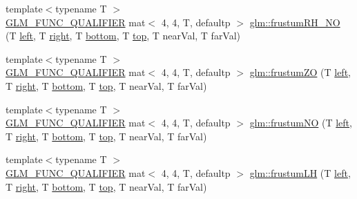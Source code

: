 \begin{DoxyCompactItemize}
\item 
{\footnotesize template$<$typename T $>$ }\\\hyperlink{setup_8hpp_a33fdea6f91c5f834105f7415e2a64407}{G\+L\+M\+\_\+\+F\+U\+N\+C\+\_\+\+Q\+U\+A\+L\+I\+F\+I\+ER} mat$<$ 4, 4, T, defaultp $>$ \hyperlink{group__gtc__matrix__transform_ga9236c8439f21be186b79c97b588836b9}{glm\+::frustum\+R\+H\+\_\+\+NO} (T \hyperlink{_s_d_l__opengl__glext_8h_a85b8f6c07fbc1fb5d77c2ae090f21995}{left}, T \hyperlink{_s_d_l__opengl__glext_8h_a5ffadbbacc6b89cf6218bc43b384d3fe}{right}, T \hyperlink{_s_d_l__opengl__glext_8h_a95fc257e5ddf46f7db9d5e898cdf1991}{bottom}, T \hyperlink{_s_d_l__opengl__glext_8h_a5ab323daeacf8dfdb8f91132fecdca23}{top}, T near\+Val, T far\+Val)
\item 
{\footnotesize template$<$typename T $>$ }\\\hyperlink{setup_8hpp_a33fdea6f91c5f834105f7415e2a64407}{G\+L\+M\+\_\+\+F\+U\+N\+C\+\_\+\+Q\+U\+A\+L\+I\+F\+I\+ER} mat$<$ 4, 4, T, defaultp $>$ \hyperlink{group__gtc__matrix__transform_gaa73322e152edf50cf30a6edac342a757}{glm\+::frustum\+ZO} (T \hyperlink{_s_d_l__opengl__glext_8h_a85b8f6c07fbc1fb5d77c2ae090f21995}{left}, T \hyperlink{_s_d_l__opengl__glext_8h_a5ffadbbacc6b89cf6218bc43b384d3fe}{right}, T \hyperlink{_s_d_l__opengl__glext_8h_a95fc257e5ddf46f7db9d5e898cdf1991}{bottom}, T \hyperlink{_s_d_l__opengl__glext_8h_a5ab323daeacf8dfdb8f91132fecdca23}{top}, T near\+Val, T far\+Val)
\item 
{\footnotesize template$<$typename T $>$ }\\\hyperlink{setup_8hpp_a33fdea6f91c5f834105f7415e2a64407}{G\+L\+M\+\_\+\+F\+U\+N\+C\+\_\+\+Q\+U\+A\+L\+I\+F\+I\+ER} mat$<$ 4, 4, T, defaultp $>$ \hyperlink{group__gtc__matrix__transform_gae34ec664ad44860bf4b5ba631f0e0e90}{glm\+::frustum\+NO} (T \hyperlink{_s_d_l__opengl__glext_8h_a85b8f6c07fbc1fb5d77c2ae090f21995}{left}, T \hyperlink{_s_d_l__opengl__glext_8h_a5ffadbbacc6b89cf6218bc43b384d3fe}{right}, T \hyperlink{_s_d_l__opengl__glext_8h_a95fc257e5ddf46f7db9d5e898cdf1991}{bottom}, T \hyperlink{_s_d_l__opengl__glext_8h_a5ab323daeacf8dfdb8f91132fecdca23}{top}, T near\+Val, T far\+Val)
\item 
{\footnotesize template$<$typename T $>$ }\\\hyperlink{setup_8hpp_a33fdea6f91c5f834105f7415e2a64407}{G\+L\+M\+\_\+\+F\+U\+N\+C\+\_\+\+Q\+U\+A\+L\+I\+F\+I\+ER} mat$<$ 4, 4, T, defaultp $>$ \hyperlink{group__gtc__matrix__transform_gae4277c37f61d81da01bc9db14ea90296}{glm\+::frustum\+LH} (T \hyperlink{_s_d_l__opengl__glext_8h_a85b8f6c07fbc1fb5d77c2ae090f21995}{left}, T \hyperlink{_s_d_l__opengl__glext_8h_a5ffadbbacc6b89cf6218bc43b384d3fe}{right}, T \hyperlink{_s_d_l__opengl__glext_8h_a95fc257e5ddf46f7db9d5e898cdf1991}{bottom}, T \hyperlink{_s_d_l__opengl__glext_8h_a5ab323daeacf8dfdb8f91132fecdca23}{top}, T near\+Val, T far\+Val)

\end{DoxyCompactItemize}
